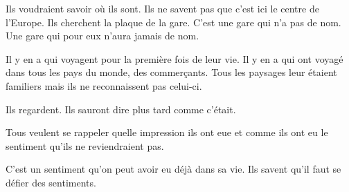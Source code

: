 {Ils voudraient savoir où ils sont. Ils ne savent pas que c'est ici le
centre de l'Europe. Ils cherchent la plaque de la gare. C'est une
gare qui n'a pas de nom. Une gare qui pour eux n'aura jamais de nom.

\bigskip

Il y en a qui voyagent pour la première fois de leur vie. Il y en a
qui ont voyagé dans tous les pays du monde, des commerçants. Tous les
paysages leur étaient familiers mais ils ne reconnaissent pas
celui-ci.

Ils regardent. Ils sauront dire plus tard comme c'était.

Tous veulent se rappeler quelle impression ils ont eue et comme ils
ont eu le sentiment qu'ils ne reviendraient pas.

C'est un sentiment qu'on peut avoir eu déjà dans sa vie. Ils savent qu'il faut se défier des sentiments.
}

